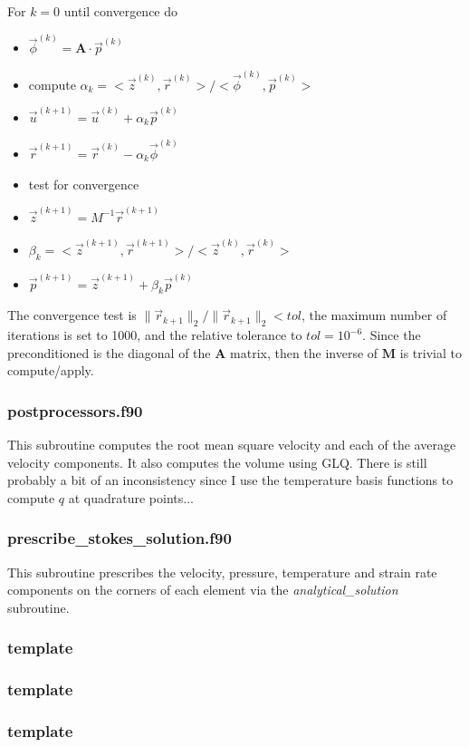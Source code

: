 For $k=0$ until convergence do
 \begin{itemize}
 \item ${\vec \phi}^{(k)}={\bm A}\cdot {\vec p}^{(k)}$
 \item compute $\alpha_k = <{\vec z}^{(k)},{\vec r}^{(k)}>/<{\vec \phi}^{(k)},{\vec p}^{(k)}>$
 \item ${\vec u}^{(k+1)}={\vec u}^{(k)}+\alpha_k {\vec p}^{(k)}$
 \item ${\vec r}^{(k+1)}={\vec r}^{(k)}-\alpha_k{\vec \phi}^{(k)}$
 \item test for convergence
 \item ${\vec z}^{(k+1)}=M^{-1} {\vec r}^{(k+1)}$
 \item $\beta_k= <{\vec z}^{(k+1)},{\vec r}^{(k+1)}>/<{\vec z}^{(k)},{\vec r}^{(k)}>$
 \item ${\vec p}^{(k+1)}={\vec z}^{(k+1)}+\beta_k {\vec p}^{(k)}$
 \end{itemize}
 The convergence test is $\| \vec{r}_{k+1} \|_2/ \| \vec{r}_{k+1} \|_2 < tol$, 
 the maximum number of iterations is set to 1000, and the relative tolerance to $tol=10^{-6}$.
 Since the preconditioned is the diagonal of the ${\bm A}$ matrix, then the inverse of 
 ${\bm M}$ is trivial to compute/apply. 
 \subsubsection{postprocessors.f90}
 This subroutine computes the root mean square velocity
 and each of the average velocity components. It also 
 computes the volume using GLQ.
 There is still probably a bit of an inconsistency since I use the 
 temperature basis functions to compute $q$ at quadrature points...
 \subsubsection{prescribe\_stokes\_solution.f90}
 This subroutine prescribes the velocity, pressure, temperature and strain rate components
 on the corners of each element via the {\sl analytical\_solution} subroutine.
 \subsubsection{template}

 \subsubsection{template}

 \subsubsection{template}

